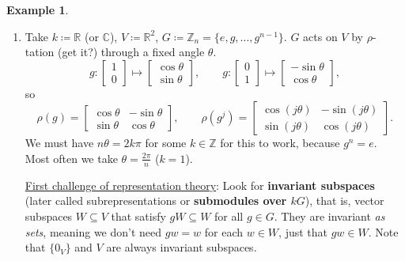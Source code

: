 \documentclass[12pt]{article}
\newcommand{\z}{\mathbb{Z}}
\newcommand{\cx}{\mathbb{C}}
\newcommand{\real}{\mathbb{R}}
\newcommand{\ita}[1]{\textit{#1}}
\theoremstyle{definition}
\newtheorem{example}{Example}[section]
\begin{document}
\begin{example}
    \noindent
    \begin{enumerate}
        \item Take $k\coloneqq \real$ (or $\cx$), $V\coloneqq \real^2$, $G\coloneqq \z_n=\{e,g,\dotsc,g^{n-1}\}$. $G$ acts on $V$ by $\rho$-tation (get it?) through a fixed angle $\theta$.
        \begin{equation}
            g:
            \begin{bmatrix}
                1 \\
                0
            \end{bmatrix}
            \mapsto
            \begin{bmatrix}
                \cos\theta \\
                \sin\theta
            \end{bmatrix},
            \qquad
            g:
            \begin{bmatrix}
                0 \\
                1
            \end{bmatrix}
            \mapsto
            \begin{bmatrix}
                -\sin\theta \\
                \cos\theta
            \end{bmatrix},
        \end{equation}
        so
        \begin{equation}
            \rho(g)=
            \begin{bmatrix}
                \cos\theta & -\sin\theta \\
                \sin\theta & \cos\theta
            \end{bmatrix},
            \qquad
            \rho(g^j)=
            \begin{bmatrix}
                \cos(j\theta) & -\sin(j\theta) \\
                \sin(j\theta) & \cos(j\theta)
            \end{bmatrix}.
        \end{equation}
        We must have $n\theta=2k\pi$ for some $k\in\z$ for this to work, because $g^n=e$. Most often we take $\theta=\frac{2\pi}{n}$ ($k=1$).
        
        \underline{First challenge of representation theory}: Look for \textbf{invariant subspaces} (later called subrepresentations or \textbf{submodules over $kG$}), that is, vector subspaces $W\subseteq V$ that satisfy $gW\subseteq W$ for all $g\in G$. They are invariant \ita{as sets}, meaning we don't need $gw=w$ for each $w\in W$, just that $gw\in W$. Note that $\{0_V\}$ and $V$ are always invariant subspaces.
        

\end{enumerate}
\end{example}
\end{document}

